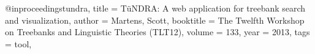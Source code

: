 @inproceedings{tundra,
  title = {{T{\"u}NDRA}: A web application for treebank search and visualization},
  author = {Martens, Scott},
  booktitle = {The Twelfth Workshop on Treebanks and Linguistic Theories (TLT12)},
  volume = {133},
  year = {2013},
  tags = {tool},
}